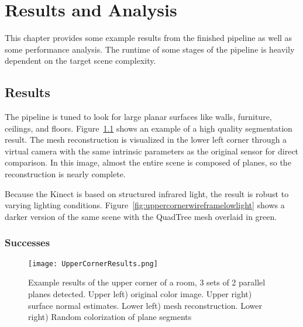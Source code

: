 
\chapter{Results and Analysis}
\label{chap:analysis}
This chapter provides some example results from the finished pipeline as well as some performance analysis. The runtime of some stages of the pipeline is heavily dependent on the target scene complexity.

\section{Results}
The pipeline is tuned to look for large planar surfaces like walls, furniture, ceilings, and floors. Figure~\ref{fig:uppercorner} shows an example of a high quality segmentation result. The mesh reconstruction is visualized in the lower left corner through a virtual camera with the same intrinsic parameters as the original sensor for direct comparison. In this image, almost the entire scene is composed of planes, so the reconstruction is nearly complete.\par 
Because the Kinect is based on structured infrared light, the result is robust to varying lighting conditions. Figure~\ref{fig:uppercornerwireframelowlight} shows a darker version of the same scene with the QuadTree mesh overlaid in green.
\subsection{Successes}
\begin{figure}[!htpb]
    \centering
    \texttt{[image: UpperCornerResults.png]}
    \caption{Example results of the upper corner of a room, 3 sets of 2 parallel planes detected.  Upper left) original color image. Upper right) surface normal estimates. Lower left) mesh reconstruction. Lower right) Random colorization of plane segments}
    \label{fig:uppercorner}
\end{figure}

